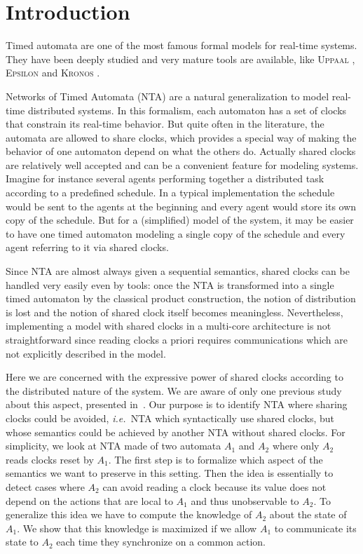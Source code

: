 \documentclass{LMCS}
\theoremstyle{plain}\newtheorem*{prop11}{Proposition~\ref{prop:states} bis}
\def\ie{{\em i.e.\ }}
\begin{document}
\section*{Introduction}
Timed automata \cite{AD94} are one of the most famous formal models for
real-time systems. They have been deeply studied and very mature tools are
available, like \textsc{Uppaal} \cite{uppaal}, \textsc{Epsilon}
\cite{Epsilon93} and \textsc{Kronos} \cite{kronos}.

Networks of Timed Automata (NTA) are a natural generalization to model real-time
distributed systems. In this formalism, each automaton has a set of clocks that
constrain its real-time behavior. But quite often in the literature, the
automata are allowed to share clocks, which provides a special way of making the
behavior of one automaton depend on what the others do. Actually shared clocks
are relatively well accepted and can be a convenient feature for modeling
systems. Imagine for instance several agents performing together a distributed
task according to a predefined schedule. In a typical implementation the
schedule would be sent to the agents at the beginning and every agent would
store its own copy of the schedule. But for a (simplified) model of the system,
it may be easier to have one timed automaton modeling a single copy of the
schedule and every agent referring to it via shared clocks.

Since NTA are almost always given a sequential semantics,
shared clocks can be handled very easily even by tools: once the NTA is
transformed into a single timed automaton by the classical product construction,
the notion of distribution is lost and the notion of shared clock itself becomes
meaningless. Nevertheless, implementing a model with shared clocks in a
multi-core architecture is not straightforward since reading clocks a priori
requires communications which are not explicitly described in the model.

Here we are concerned with the expressive power of shared clocks according to
the distributed nature of the system. We are aware of only one previous study
about this aspect, presented in~\cite{LPW07}.
Our purpose is to identify NTA where sharing clocks could be avoided,  \ie NTA
which syntactically use shared clocks, but whose semantics could be achieved by
another NTA without shared clocks. For simplicity, we look at NTA made of two
automata $A_1$ and $A_2$ where only $A_2$ reads clocks reset by $A_1$.
The first step is to formalize which aspect of the semantics we want to preserve
in this setting. Then the idea is essentially to detect cases where $A_2$ can
avoid reading a clock because its value does not depend on the actions that are
local to $A_1$ and thus unobservable to $A_2$. To generalize this idea we
have to compute the knowledge of $A_2$ about the state of $A_1$. We show
that this knowledge is maximized if we allow $A_1$ to communicate its state to
$A_2$ each time they synchronize on a common action.
\end{document}
